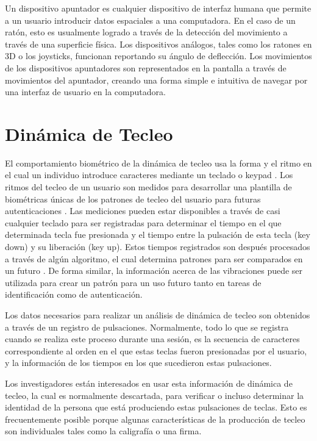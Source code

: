 Un dispositivo apuntador es cualquier dispositivo de interfaz humana
que permite a un usuario introducir datos espaciales a una
computadora. En el caso de un ratón, esto es usualmente logrado a
través de la detección del movimiento a través de una superficie
física. Los dispositivos análogos, tales como los ratones en 3D o los
joysticks, funcionan reportando su ángulo de deflección. Los
movimientos de los dispositivos apuntadores son representados en la
pantalla a través de movimientos del apuntador, creando una forma
simple e intuitiva de navegar por una interfaz de usuario en la computadora.

\section{Dinámica de Tecleo}
\label{dinamica-de-tecleo}

El comportamiento biométrico de la dinámica de tecleo usa la forma y
el ritmo en el cual un individuo introduce caracteres mediante un
teclado o keypad \cite{deng2013keystroke} \cite{araujo2005user}
\cite{shepherd1995continuous}. Los ritmos del tecleo de un usuario son
medidos para desarrollar una plantilla de biométricas únicas de los
patrones de tecleo del usuario para futuras autenticaciones
\cite{panasiuk2010modified}. Las mediciones pueden estar disponibles a
través de casi cualquier teclado para ser registradas para determinar
el tiempo en el que determinada tecla fue presionada y el tiempo entre
la pulsación de esta tecla (key down) y su liberación (key up). Estos
tiempos registrados son después procesados a través de algún
algoritmo, el cual determina patrones para ser comparados en un futuro
\cite{chang2011user}. De forma similar, la información acerca de las
vibraciones puede ser utilizada para crear un patrón para un uso
futuro tanto en tareas de identificación como de autenticación.

Los datos necesarios para realizar un análisis de dinámica de tecleo
son obtenidos a través de un registro de pulsaciones. Normalmente,
todo lo que se registra cuando se realiza este proceso durante una
sesión, es la secuencia de caracteres correspondiente al orden en el
que estas teclas fueron presionadas por el usuario, y la información
de los tiempos en los que sucedieron estas pulsaciones.

Los investigadores están interesados en usar esta información de
dinámica de tecleo, la cual es normalmente descartada, para verificar
o incluso determinar la identidad de la persona que está produciendo
estas pulsaciones de teclas. Esto es frecuentemente posible porque
algunas características de la producción de tecleo son individuales
tales como la caligrafía o una firma.

